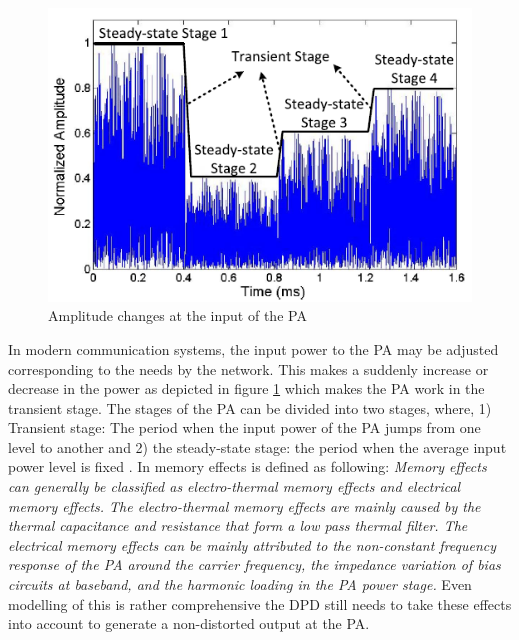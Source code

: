\begin{figure}[H]
\centering 
\includegraphics[scale = 0.7]{figures/ch1/amplitude.png}
\caption{Amplitude changes at the input of the PA \citep{guo2015}}
\label{fig:mem_amp}
\end{figure}




In modern communication systems, the input power to the PA may be adjusted corresponding to the needs by the network. This makes a suddenly increase or decrease in the power as depicted in figure \ref{fig:mem_amp} which makes the PA work in the transient stage. The stages of the PA can be divided into two stages, where, 1) Transient stage: The period when the input power of the PA jumps from one level
to another and 2) the steady-state stage: the period when the
average input power level is fixed \citep{guo2015}. In \citep{liu2007} memory effects is defined as following:  
\textit{Memory effects
can generally be classified as electro-thermal memory effects
and electrical memory effects. The electro-thermal memory
effects are mainly caused by the thermal capacitance and
resistance that form a low pass thermal filter. The electrical
memory effects can be mainly attributed to the non-constant
frequency response of the PA around the carrier frequency,
the impedance variation of bias circuits at baseband, and the
harmonic loading in the PA power stage.} Even modelling of this is rather comprehensive the DPD still needs to take these effects into account to generate a non-distorted output at the PA.  



